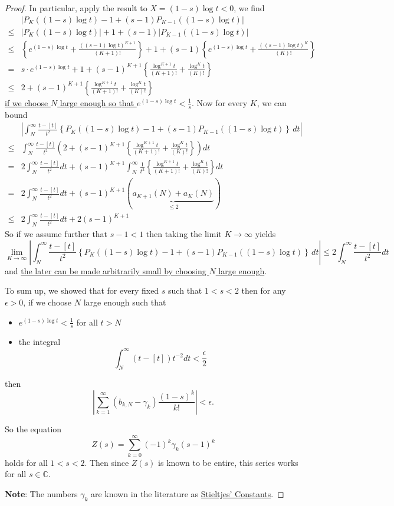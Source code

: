\documentclass{article}
\newcommand{\C}{\mathbb{C}}
\newcommand{\Abs}[1]{\left| #1 \right|}
\begin{document}
\begin{proof}
In particular, apply the result to $X = (1 - s) \log t < 0$, we find
\begin{align*}
&\Abs{P_K((1-s)\log t) - 1 + (s - 1) P_{K-1}((1-s)\log t)}\\
\leq& \Abs{P_K((1-s)\log t)} + 1 + (s - 1) \Abs{P_{K-1}((1-s)\log t)}\\
\leq& \left\{ e^{(1-s) \log t} + \frac{((s-1)\log t)^{K+1}}{(K+1)!} \right\} + 1 + (s-1) \left\{ e^{(1-s) \log t} + \frac{((s-1)\log t)^{K}}{(K)!} \right\}\\
=& s \cdot e^{(1-s) \log t} + 1 + (s - 1)^{K+1} \left\{\frac{\log^{K+1} t}{(K+1)!} + \frac{\log^K t}{(K)!} \right\}\\
\leq& 2 + (s - 1)^{K+1} \left\{\frac{\log^{K+1} t}{(K+1)!} + \frac{\log^K t}{(K)!} \right\}
\end{align*}
\underline{if we choose $N$ large enough so that $e^{(1 - s) \log t} < \frac{1}{s}$}. Now for every $K$, we can bound
\begin{align*}
&\Abs{\int_N^\infty \frac{t - [t]}{t^2} \left\{ P_K((1-s)\log t) - 1 + (s - 1) P_{K-1}((1-s)\log t) \right\} \, dt}\\
\leq& \int_N^{\infty} \frac{t - [t]}{t^2} \left(2 + (s - 1)^{K+1} \left\{\frac{\log^{K+1} t}{(K+1)!} + \frac{\log^K t}{(K)!} \right\} \right) dt\\
= &2 \int_N^{\infty} \frac{t - [t]}{t^2} dt + (s - 1)^{K+1} \int_N^{\infty} \frac{1}{t^2} \left\{\frac{\log^{K+1} t}{(K+1)!} + \frac{\log^K t}{(K)!} \right\} dt\\
= &2 \int_N^{\infty} \frac{t - [t]}{t^2} dt + (s - 1)^{K+1} (\underbrace{a_{K+1}(N) + a_K(N)}_{\leq 2})\\
\leq & 2 \int_N^{\infty} \frac{t - [t]}{t^2} dt + 2 (s - 1)^{K + 1}
\end{align*}
So if we assume further that $s - 1 < 1$ then taking the limit $K \rightarrow \infty$ yields
$$\lim_{K \rightarrow \infty} \Abs{\int_N^\infty \frac{t - [t]}{t^2} \left\{ P_K((1-s)\log t) - 1 + (s - 1) P_{K-1}((1-s)\log t) \right\} \, dt} \leq 2 \int_N^{\infty} \frac{t - [t]}{t^2} dt$$
and \underline{the later can be made arbitrarily small by choosing $N$ large enough}.

To sum up, we showed that for every fixed $s$ such that $1 < s < 2$ then for any $\epsilon > 0$, if we choose $N$ large enough such that
\begin{itemize}
\item $e^{(1-s) \log t} < \frac{1}{s}$ for all $t > N$
\item the integral
$$\int_N^{\infty} (t - [t]) t^{-2} dt < \frac{\epsilon}{2}$$
\end{itemize}
then
$$\Abs{\sum_{k = 1}^{\infty} (b_{k,N} - \gamma_k) \frac{(1 - s)^k}{k!}} < \epsilon.$$

So the equation
$$Z(s) = \sum_{k=0}^{\infty} (-1)^k \gamma_k (s - 1)^k$$
holds for all $1 < s < 2$. Then since $Z(s)$ is known to be entire, this series works for all $s \in \C$.

\textbf{Note}: The numbers $\gamma_k$ are known in the literature as \href{https://en.wikipedia.org/wiki/Stieltjes\_constants}{Stieltjes' Constants}.
\end{proof}

\unless\ifdefined\IsMainDocument
\end{document}
